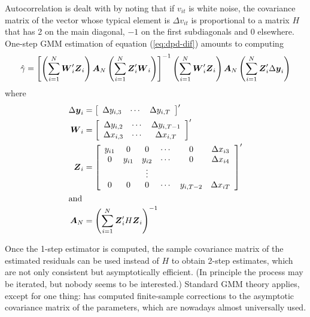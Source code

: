 Autocorrelation is dealt with by noting that if $v_{it}$ is white
noise, the covariance matrix of the vector whose typical element is
$\Delta v_{it}$ is proportional to a matrix $H$ that has 2 on the main
diagonal, $-1$ on the first subdiagonals and 0 elsewhere.  One-step
GMM estimation of equation (\ref{eq:dpd-dif}) amounts to computing
\begin{equation}
\label{eq:dif-gmm}
  \hat{\gamma} = \left[ 
    \left( \sum_{i=1}^N \boldsymbol{W}_i'\boldsymbol{Z}_i \right) \boldsymbol{A}_N
    \left( \sum_{i=1}^N \boldsymbol{Z}_i'\boldsymbol{W}_i \right) \right]^{-1} 
    \left( \sum_{i=1}^N \boldsymbol{W}_i'\boldsymbol{Z}_i \right) \boldsymbol{A}_N
    \left( \sum_{i=1}^N \boldsymbol{Z}_i'\Delta \boldsymbol{y}_i \right)
\end{equation}
where
\begin{align*}
  \Delta \boldsymbol{y}_i  & =
     \left[ \begin{array}{ccc}
         \Delta y_{i,3} & \cdots & \Delta y_{i,T}
       \end{array} \right]' \\
  \boldsymbol{W}_i  & = 
     \left[ \begin{array}{ccc}
         \Delta y_{i,2} & \cdots & \Delta y_{i,T-1} \\
         \Delta x_{i,3} & \cdots & \Delta x_{i,T} \\
       \end{array} \right]' \\
  \boldsymbol{Z}_i  & = 
     \left[ \begin{array}{ccccccc}
         y_{i1} & 0 & 0 & \cdots & 0 & \Delta x_{i3}\\
         0 & y_{i1} & y_{i2} & \cdots & 0 & \Delta x_{i4}\\
         & & \vdots \\
         0 & 0 & 0 & \cdots & y_{i, T-2} & \Delta x_{iT} \\
       \end{array} \right]' \\
  \intertext{and}
  \boldsymbol{A}_N & = \left( \sum_{i=1}^N \boldsymbol{Z}_i' H \boldsymbol{Z}_i \right)^{-1}
\end{align*}

Once the 1-step estimator is computed, the sample covariance matrix of
the estimated residuals can be used instead of $H$ to obtain 2-step
estimates, which are not only consistent but asymptotically
efficient. (In principle the process may be iterated, but nobody seems
to be interested.) Standard GMM theory applies, except for one thing:
\cite{Windmeijer05} has computed finite-sample corrections to the
asymptotic covariance matrix of the parameters, which are nowadays
almost universally used.

